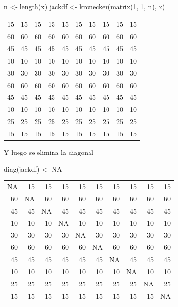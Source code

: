 \documentclass[
  12pt,
]{book}
\newenvironment{Shaded}{\begin{snugshade}}{\end{snugshade}}
\newcommand{\ConstantTok}[1]{\textcolor[rgb]{0.00,0.00,0.00}{#1}}
\newcommand{\DecValTok}[1]{\textcolor[rgb]{0.00,0.00,0.81}{#1}}
\newcommand{\FunctionTok}[1]{\textcolor[rgb]{0.00,0.00,0.00}{#1}}
\newcommand{\NormalTok}[1]{#1}
\newcommand{\OtherTok}[1]{\textcolor[rgb]{0.56,0.35,0.01}{#1}}
\begin{document}
\begin{Shaded}
\begin{Highlighting}[]
\NormalTok{n }\OtherTok{\textless{}{-}} \FunctionTok{length}\NormalTok{(x)}
\NormalTok{jackdf }\OtherTok{\textless{}{-}} \FunctionTok{kronecker}\NormalTok{(}\FunctionTok{matrix}\NormalTok{(}\DecValTok{1}\NormalTok{, }\DecValTok{1}\NormalTok{, n), x)}
\end{Highlighting}
\end{Shaded}

\begin{longtable}[]{@{}rrrrrrrrrr@{}}
\toprule()
\endhead
15 & 15 & 15 & 15 & 15 & 15 & 15 & 15 & 15 & 15 \\
60 & 60 & 60 & 60 & 60 & 60 & 60 & 60 & 60 & 60 \\
45 & 45 & 45 & 45 & 45 & 45 & 45 & 45 & 45 & 45 \\
10 & 10 & 10 & 10 & 10 & 10 & 10 & 10 & 10 & 10 \\
30 & 30 & 30 & 30 & 30 & 30 & 30 & 30 & 30 & 30 \\
60 & 60 & 60 & 60 & 60 & 60 & 60 & 60 & 60 & 60 \\
45 & 45 & 45 & 45 & 45 & 45 & 45 & 45 & 45 & 45 \\
10 & 10 & 10 & 10 & 10 & 10 & 10 & 10 & 10 & 10 \\
25 & 25 & 25 & 25 & 25 & 25 & 25 & 25 & 25 & 25 \\
15 & 15 & 15 & 15 & 15 & 15 & 15 & 15 & 15 & 15 \\
\bottomrule()
\end{longtable}

Y luego se elimina la diagonal

\begin{Shaded}
\begin{Highlighting}[]
\FunctionTok{diag}\NormalTok{(jackdf) }\OtherTok{\textless{}{-}} \ConstantTok{NA}
\end{Highlighting}
\end{Shaded}

\begin{longtable}[]{@{}rrrrrrrrrr@{}}
\toprule()
\endhead
NA & 15 & 15 & 15 & 15 & 15 & 15 & 15 & 15 & 15 \\
60 & NA & 60 & 60 & 60 & 60 & 60 & 60 & 60 & 60 \\
45 & 45 & NA & 45 & 45 & 45 & 45 & 45 & 45 & 45 \\
10 & 10 & 10 & NA & 10 & 10 & 10 & 10 & 10 & 10 \\
30 & 30 & 30 & 30 & NA & 30 & 30 & 30 & 30 & 30 \\
60 & 60 & 60 & 60 & 60 & NA & 60 & 60 & 60 & 60 \\
45 & 45 & 45 & 45 & 45 & 45 & NA & 45 & 45 & 45 \\
10 & 10 & 10 & 10 & 10 & 10 & 10 & NA & 10 & 10 \\
25 & 25 & 25 & 25 & 25 & 25 & 25 & 25 & NA & 25 \\
15 & 15 & 15 & 15 & 15 & 15 & 15 & 15 & 15 & NA \\
\bottomrule()
\end{longtable}
\end{document}
